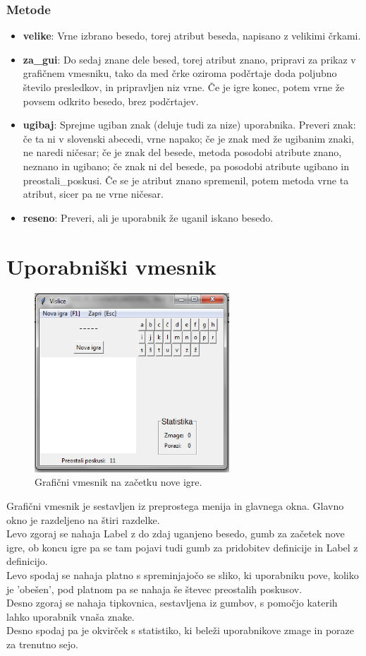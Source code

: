 \documentclass [a4paper, 12pt] {article}
\begin{document}
\subsubsection {Metode}
\begin {itemize}
\item \textbf {velike}: Vrne izbrano besedo, torej atribut beseda, napisano z velikimi črkami.
\item \textbf {za\_gui}: Do sedaj znane dele besed, torej atribut znano, pripravi za prikaz v grafičnem vmesniku, tako da med črke oziroma podčrtaje doda poljubno število presledkov, in pripravljen niz vrne. Če je igre konec, potem vrne že povsem odkrito besedo, brez podčrtajev. 
\item \textbf{ugibaj}: Sprejme ugiban znak (deluje tudi za nize) uporabnika. Preveri znak: če ta ni v slovenski abecedi, vrne napako; če je znak med že ugibanim znaki, ne naredi ničesar; če je znak del besede, metoda posodobi atribute znano, neznano in ugibano; če znak ni del besede, pa posodobi atribute ugibano in preostali\_poskusi. Če se je atribut znano spremenil, potem metoda vrne ta atribut, sicer pa ne vrne ničesar. 
\item \textbf{reseno}: Preveri, ali je uporabnik že uganil iskano besedo.
\end {itemize}

\section {Uporabniški vmesnik}
\begin {figure} [h]
\centering
\includegraphics [height=190pt] {slike/za_porocilo_gui.png}
\caption {Grafični vmesnik na začetku nove igre.}
\end {figure}
\noindent Grafični vmesnik je sestavljen iz preprostega menija in glavnega okna.  Glavno okno je razdeljeno na štiri razdelke. \\
Levo zgoraj se nahaja Label z do zdaj uganjeno besedo, gumb za začetek nove igre, ob koncu igre pa se tam pojavi tudi gumb za pridobitev definicije in Label z definicijo. \\
Levo spodaj se nahaja platno s spreminjajočo se sliko, ki uporabniku pove, koliko je 'obešen', pod platnom pa se nahaja še števec preostalih poskusov.  \\
Desno zgoraj se nahaja tipkovnica, sestavljena iz gumbov, s pomočjo katerih lahko uporabnik vnaša znake. \\
Desno spodaj pa je okvirček s statistiko, ki beleži uporabnikove zmage in poraze za trenutno sejo. 
\end{document}
